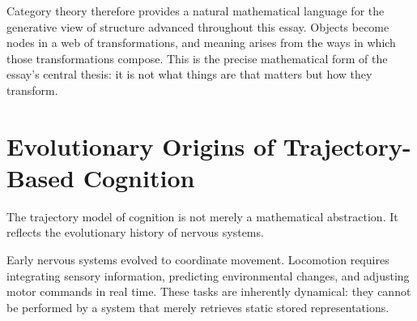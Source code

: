 \documentclass[11pt, a4paper]{article}
\theoremstyle{plain}
\theoremstyle{definition}
\theoremstyle{remark}
\begin{document}
Category theory therefore provides a natural mathematical language for the generative
view of structure advanced throughout this essay. Objects become nodes in a web of
transformations, and meaning arises from the ways in which those transformations compose.
This is the precise mathematical form of the essay's central thesis: it is not what
things are that matters but how they transform.


\section{Evolutionary Origins of Trajectory-Based Cognition}

The trajectory model of cognition is not merely a mathematical abstraction. It reflects
the evolutionary history of nervous systems.

Early nervous systems evolved to coordinate movement. Locomotion requires integrating
sensory information, predicting environmental changes, and adjusting motor commands in
real time. These tasks are inherently dynamical: they cannot be performed by a system
that merely retrieves static stored representations.
\end{document}
